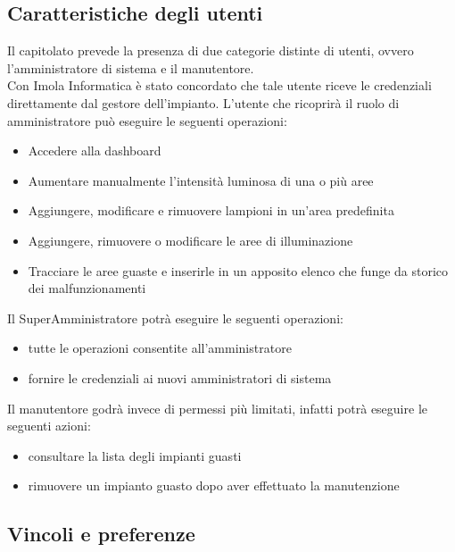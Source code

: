 \documentclass[12pt]{article}
\begin{document}
\subsection{Caratteristiche degli utenti}
Il capitolato prevede la presenza di due categorie distinte di utenti, ovvero l'amministratore di sistema e il manutentore. \\
Con Imola Informatica è stato concordato che tale utente riceve le credenziali direttamente dal gestore dell'impianto.
L'utente che ricoprirà il ruolo di amministratore può eseguire le seguenti operazioni:
\begin{itemize}
	\item Accedere alla dashboard
	\item Aumentare manualmente l'intensità luminosa di una o più aree
	\item Aggiungere, modificare e rimuovere lampioni in un'area predefinita
	\item Aggiungere, rimuovere o modificare le aree di illuminazione
	\item Tracciare le aree guaste e inserirle in un apposito elenco che funge da storico dei malfunzionamenti
\end{itemize}
Il SuperAmministratore potrà eseguire le seguenti operazioni:
\begin{itemize}
	\item tutte le operazioni consentite all'amministratore
	\item fornire le credenziali ai nuovi amministratori di sistema
\end{itemize}
Il manutentore godrà invece di permessi più limitati, infatti potrà eseguire le seguenti azioni:
\begin{itemize}
	\item consultare la lista degli impianti guasti
	\item rimuovere un impianto guasto dopo aver effettuato la manutenzione
\end{itemize}
\subsection{Vincoli e preferenze}
\end{document}
